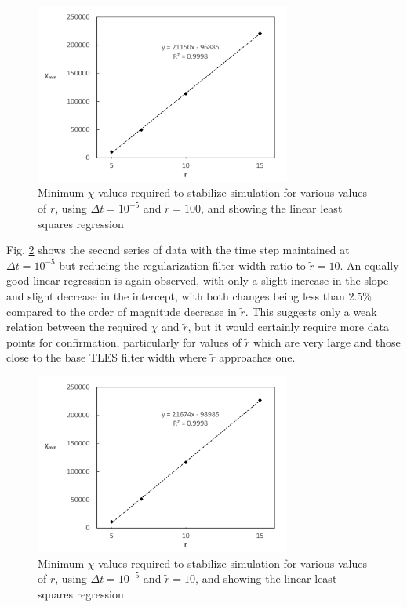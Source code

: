 \begin{figure}[!tb]
\centering
\includegraphics[width=0.75\textwidth]{figures/min_chi_dt5_r100.pdf}
\caption{Minimum $\chi$ values required to stabilize simulation for various values of $r$, using $\Delta t=10^{-5}$ and $\tilde{r}=100$, and showing the linear least squares regression}
\label{fig:min_chi_dt5_r100}
\end{figure}

Fig. \ref{fig:min_chi_dt5_r10} shows the second series of data  with the time step maintained at $\Delta t=10^{-5}$ but reducing the regularization filter width ratio to $\tilde{r}=10$. An equally good linear regression is again observed, with only a slight increase in the slope and slight decrease in the intercept, with both changes being less than $2.5\%$ compared to the order of magnitude decrease in $\tilde{r}$. This suggests only a weak relation between the required $\chi$ and $\tilde{r}$, but it would certainly require more data points for confirmation, particularly for values of $\tilde{r}$ which are very large and those close to the base TLES filter width where $\tilde{r}$ approaches one.

\begin{figure}[!tb]
\centering
\includegraphics[width=0.75\textwidth]{figures/min_chi_dt5_r10.pdf}
\caption{Minimum $\chi$ values required to stabilize simulation for various values of $r$, using $\Delta t=10^{-5}$ and $\tilde{r}=10$, and showing the linear least squares regression}
\label{fig:min_chi_dt5_r10}
\end{figure}

